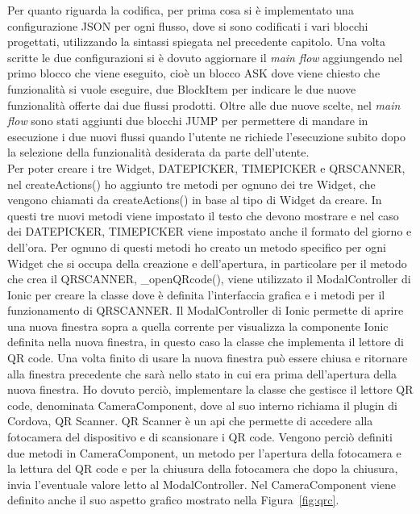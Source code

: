 Per quanto riguarda la codifica, per prima cosa si è implementato una configurazione JSON per ogni flusso, dove si sono codificati i vari blocchi progettati, utilizzando la sintassi spiegata nel precedente capitolo. Una volta scritte le due configurazioni si è dovuto aggiornare il \emph{main flow} aggiungendo nel primo blocco che viene eseguito, cioè un blocco ASK dove viene chiesto che funzionalità si vuole eseguire, due BlockItem per indicare le due nuove funzionalità offerte dai due flussi prodotti. Oltre alle due nuove scelte, nel \emph{main flow} sono stati aggiunti due blocchi JUMP per permettere di mandare in esecuzione i due nuovi flussi quando l'utente ne richiede l'esecuzione subito dopo la selezione della funzionalità desiderata da parte dell'utente.\\

Per poter creare i tre Widget, DATEPICKER, TIMEPICKER e QRSCANNER, nel createActions() ho aggiunto tre metodi per ognuno dei tre Widget, che vengono chiamati da createActions() in base al tipo di Widget da creare. In questi tre nuovi metodi viene impostato il testo che devono mostrare e nel caso dei DATEPICKER, TIMEPICKER viene impostato anche il formato del giorno e dell'ora. Per ognuno di questi metodi ho creato un metodo specifico per ogni Widget che si occupa della creazione e dell'apertura, in particolare per il metodo che crea il QRSCANNER, \_openQRcode(), viene utilizzato il ModalController di Ionic per creare la classe dove è definita l'interfaccia grafica e i metodi per il funzionamento di QRSCANNER. Il ModalController di Ionic permette di aprire una nuova finestra sopra a quella corrente per visualizza la componente Ionic definita nella nuova finestra, in questo caso la classe che implementa il lettore di \gls{QR code}\ap{[g]}. Una volta finito di usare la nuova finestra può essere chiusa e ritornare alla finestra precedente che sarà nello stato in cui era prima dell'apertura della nuova finestra. Ho dovuto perciò, implementare la classe che gestisce il lettore \gls{QR code}\ap{[g]}, denominata CameraComponent, dove al suo interno richiama il plugin di Cordova, QR Scanner. QR Scanner è un \gls{api}\ap{[G]} che permette di accedere alla fotocamera del dispositivo e di scansionare i \gls{QR code}\ap{[g]}. Vengono perciò definiti due metodi in CameraComponent, un metodo per l'apertura della fotocamera e la lettura del \gls{QR code}\ap{[g]} e per la chiusura della fotocamera che dopo la chiusura, invia l'eventuale valore letto al ModalController. Nel CameraComponent viene definito anche il suo aspetto grafico mostrato nella Figura~\ref{fig:qrc}.\\
 
